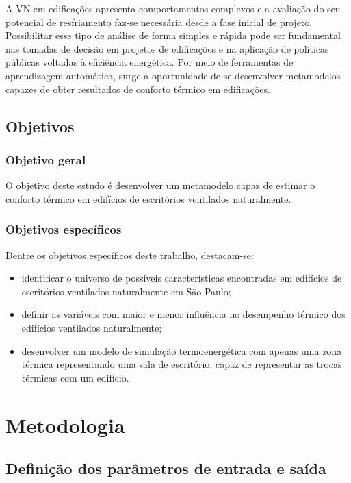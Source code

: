 \documentclass[brazil,hardcopy,openany,a5paper]{ufscthesis}
\begin{document}
	A VN em edificações apresenta comportamentos complexos e a avaliação do seu potencial de resfriamento faz-se necessária desde a fase inicial de projeto. Possibilitar esse tipo de análise de forma simples e rápida pode ser fundamental nas tomadas de decisão em projetos de edificações e na aplicação de políticas públicas voltadas à eficiência energética. Por meio de ferramentas de aprendizagem automática, surge a oportunidade de se desenvolver metamodelos capazes de obter resultados de conforto térmico em edificações.
	
	\section{Objetivos}
		\subsection{Objetivo geral}

	O objetivo deste estudo é desenvolver um metamodelo capaz de estimar o conforto térmico em edifícios de escritórios ventilados naturalmente.
	
		\subsection{Objetivos específicos}
	
	Dentre os objetivos específicos deste trabalho, destacam-se:

		\begin{itemize}
			\item identificar o universo de possíveis características encontradas em edifícios de escritórios ventilados naturalmente em São Paulo;
			\item definir as variáveis com maior e menor influência no desempenho térmico dos edifícios ventilados naturalmente;
			\item desenvolver um modelo de simulação termoenergética com apenas uma zona térmica representando uma sala de escritório, capaz de representar as trocas térmicas com um edifício. %
		\end{itemize}
	
	\chapter{Metodologia}
		\label{chapter:metodologia}

		\section{Definição dos parâmetros de entrada e saída}
		
\end{document}
